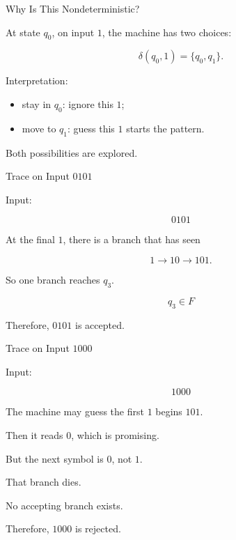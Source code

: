 \documentclass[10pt,aspectratio=169]{beamer}
\begin{document}
\begin{frame}{Why Is This Nondeterministic?}

At state \(q_0\), on input \(1\), the machine has two choices:

\[
\delta(q_0,1)=\{q_0,q_1\}.
\]

\vspace{1em}

Interpretation:

\begin{itemize}
\item stay in \(q_0\): ignore this \(1\);
\item move to \(q_1\): guess this \(1\) starts the pattern.
\end{itemize}

\vspace{1em}

Both possibilities are explored.

\end{frame}

\begin{frame}{Trace on Input \(0101\)}

Input:

\[
0101
\]

\vspace{1em}

At the final \(1\), there is a branch that has seen

\[
1 \rightarrow 10 \rightarrow 101.
\]

\vspace{1em}

So one branch reaches \(q_3\).

\[
q_3\in F
\]

Therefore, \(0101\) is accepted.

\end{frame}

\begin{frame}{Trace on Input \(1000\)}

Input:

\[
1000
\]

\vspace{1em}

The machine may guess the first \(1\) begins \(101\).

\pause

Then it reads \(0\), which is promising.

\pause

But the next symbol is \(0\), not \(1\).

\vspace{1em}

That branch dies.

\pause

No accepting branch exists.

Therefore, \(1000\) is rejected.

\end{frame}
\end{document}
